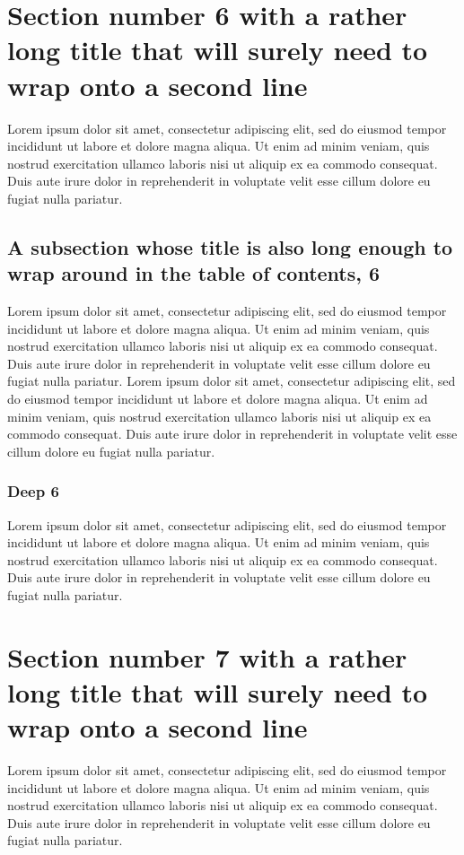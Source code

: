 \documentclass[11pt]{article}
\begin{document}
\section{Section number 6 with a rather long title that will surely need to wrap onto a second line}
Lorem ipsum dolor sit amet, consectetur adipiscing elit, sed do eiusmod tempor incididunt ut labore et dolore magna aliqua. Ut enim ad minim veniam, quis nostrud exercitation ullamco laboris nisi ut aliquip ex ea commodo consequat. Duis aute irure dolor in reprehenderit in voluptate velit esse cillum dolore eu fugiat nulla pariatur.

\subsection{A subsection whose title is also long enough to wrap around in the table of contents, 6}
Lorem ipsum dolor sit amet, consectetur adipiscing elit, sed do eiusmod tempor incididunt ut labore et dolore magna aliqua. Ut enim ad minim veniam, quis nostrud exercitation ullamco laboris nisi ut aliquip ex ea commodo consequat. Duis aute irure dolor in reprehenderit in voluptate velit esse cillum dolore eu fugiat nulla pariatur. Lorem ipsum dolor sit amet, consectetur adipiscing elit, sed do eiusmod tempor incididunt ut labore et dolore magna aliqua. Ut enim ad minim veniam, quis nostrud exercitation ullamco laboris nisi ut aliquip ex ea commodo consequat. Duis aute irure dolor in reprehenderit in voluptate velit esse cillum dolore eu fugiat nulla pariatur.

\subsubsection{Deep 6}
Lorem ipsum dolor sit amet, consectetur adipiscing elit, sed do eiusmod tempor incididunt ut labore et dolore magna aliqua. Ut enim ad minim veniam, quis nostrud exercitation ullamco laboris nisi ut aliquip ex ea commodo consequat. Duis aute irure dolor in reprehenderit in voluptate velit esse cillum dolore eu fugiat nulla pariatur.

\section{Section number 7 with a rather long title that will surely need to wrap onto a second line}
Lorem ipsum dolor sit amet, consectetur adipiscing elit, sed do eiusmod tempor incididunt ut labore et dolore magna aliqua. Ut enim ad minim veniam, quis nostrud exercitation ullamco laboris nisi ut aliquip ex ea commodo consequat. Duis aute irure dolor in reprehenderit in voluptate velit esse cillum dolore eu fugiat nulla pariatur.
\end{document}

